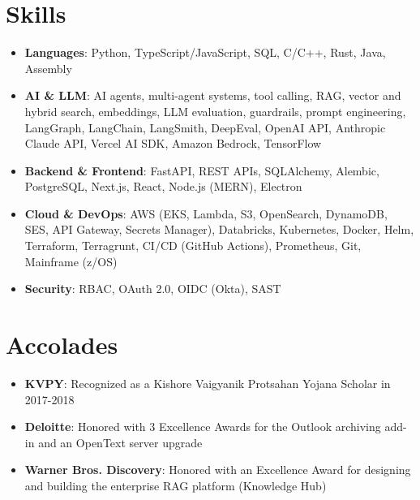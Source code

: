 \documentclass[letterpaper,9pt]{extarticle}
\newcommand{\resumeSubItem}[2]{
  \item\small{
    \textbf{#1}{: #2}
  }\vspace{-2pt}
}
\newcommand{\resumeSubHeadingListStart}{\begin{itemize}[leftmargin=*]}
\newcommand{\resumeSubHeadingListEnd}{\end{itemize}}
\begin{document}
\section{Skills}
    \resumeSubHeadingListStart
        \resumeSubItem
            {Languages} {Python, TypeScript/JavaScript, SQL, C/C++, Rust, Java, Assembly}
        \resumeSubItem
            {AI \& LLM} {AI agents, multi-agent systems, tool calling, RAG, vector and hybrid search, embeddings, LLM evaluation, guardrails, prompt engineering, LangGraph, LangChain, LangSmith, DeepEval, OpenAI API, Anthropic Claude API, Vercel AI SDK, Amazon Bedrock, TensorFlow}
        \resumeSubItem
            {Backend \& Frontend} {FastAPI, REST APIs, SQLAlchemy, Alembic, PostgreSQL, Next.js, React, Node.js (MERN), Electron}
        \resumeSubItem
            {Cloud \& DevOps} {AWS (EKS, Lambda, S3, OpenSearch, DynamoDB, SES, API Gateway, Secrets Manager), Databricks, Kubernetes, Docker, Helm, Terraform, Terragrunt, CI/CD (GitHub Actions), Prometheus, Git, Mainframe (z/OS)}
        \resumeSubItem
            {Security} {RBAC, OAuth 2.0, OIDC (Okta), SAST}
 \resumeSubHeadingListEnd

 \section{Accolades}
  \resumeSubHeadingListStart
      \resumeSubItem{KVPY}
      {Recognized as a Kishore Vaigyanik Protsahan Yojana Scholar in 2017-2018}
    \resumeSubItem{Deloitte}
      {Honored with 3 Excellence Awards for the Outlook archiving add-in and an OpenText server upgrade}
    \resumeSubItem{Warner Bros. Discovery}
      {Honored with an Excellence Award for designing and building the enterprise RAG platform (Knowledge Hub)}
  \resumeSubHeadingListEnd
\end{document}
